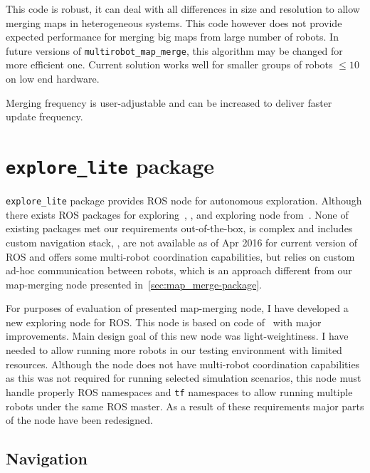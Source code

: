 This code is robust, it can deal with all differences in size and resolution to allow merging maps in heterogeneous systems. This code however does not provide expected performance for merging big maps from large number of robots. In future versions of \texttt{multi\-rob\-ot\_map\_merge}, this algorithm may be changed for more efficient one.
Current solution works well for smaller groups of robots $\le 10$ on low end hardware.

Merging frequency is user-adjustable and can be increased to deliver faster update frequency.

\section{\texttt{explore\_lite} package} %
\label{sec:explore_lite-package}

\texttt{explore\_lite} package provides \gls{ROS} node for autonomous exploration. Although there exists \gls{ROS} packages for exploring~\cite{2013:RoboCup}, \cite{DuHadway2010}, \cite{Bovbel2010} and exploring node from~\cite{Andre2014}. None of existing packages met our requirements out-of-the-box, \cite{2013:RoboCup} is complex and includes custom navigation stack, \cite{DuHadway2010}, \cite{Bovbel2010} are not available as of Apr 2016 for current version of \gls{ROS} and \cite{Andre2014} offers some multi-robot coordination capabilities, but relies on custom ad-hoc communication between robots, which is an approach different from our map-merging node presented in~\ref{sec:map_merge-package}.

For purposes of evaluation of presented map-merging node, I have developed a new exploring node for \gls{ROS}. This node is based on code of~\cite{DuHadway2010} with major improvements. Main design goal of this new node was light-weightiness. I have needed to allow running more robots in our testing environment with limited resources. Although the node does not have multi-robot coordination capabilities as this was not required for running selected simulation scenarios, this node must handle properly \gls{ROS} namespaces and \texttt{tf} namespaces to allow running multiple robots under the same \gls{ROS} master. As a result of these requirements major parts of the node have been redesigned.

\subsection{Navigation}

